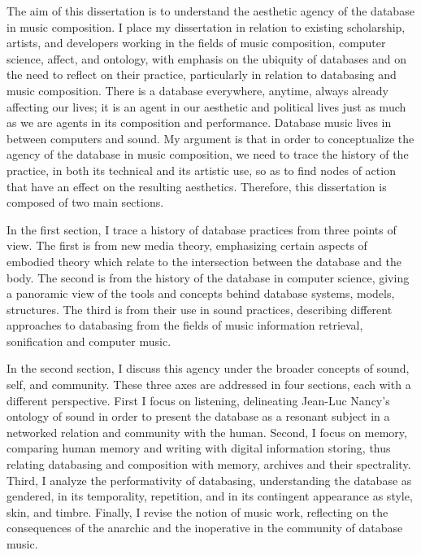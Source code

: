 The aim of this dissertation is to understand the aesthetic agency of the database in music composition. I place my dissertation in relation to existing scholarship, artists, and developers working in the fields of music composition, computer science, affect, and ontology, with emphasis on the ubiquity of databases and on the need to reflect on their practice, particularly in relation to databasing and music composition. There is a database everywhere, anytime, always already affecting our lives; it is an agent in our aesthetic and political lives just as much as we are agents in its composition and performance. Database music lives in between computers and sound. My argument is that in order to conceptualize the agency of the database in music composition, we need to trace the history of the practice, in both its technical and its artistic use, so as to find nodes of action that have an effect on the resulting aesthetics. Therefore, this dissertation is composed of two main sections.

In the first section, I trace a history of database practices from three points of view. The first is from new media theory, emphasizing certain aspects of embodied theory which relate to the intersection between the database and the body. The second is from the history of the database in computer science, giving a panoramic view of the tools and concepts behind database systems, models, structures. The third is from their use in sound practices, describing different approaches to databasing from the fields of music information retrieval, sonification and computer music. 

In the second section, I discuss this agency under the broader concepts of sound, self, and community. These three axes are addressed in four sections, each with a different perspective. First I focus on listening, delineating Jean-Luc Nancy's ontology of sound in order to present the database as a resonant subject in a networked relation and community with the human. Second, I focus on memory, comparing human memory and writing with digital information storing, thus relating databasing and composition with memory, archives and their spectrality. Third, I analyze the performativity of databasing, understanding the database as gendered, in its temporality, repetition, and in its contingent appearance as style, skin, and timbre. Finally, I revise the notion of music work, reflecting on the consequences of the anarchic and the inoperative in the community of database music.

